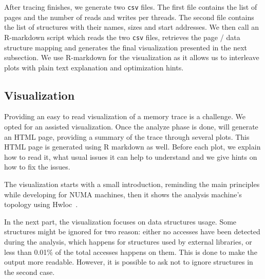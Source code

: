 After tracing finishes, we generate two \texttt{csv} files.
The first file contains the list of pages and the number of reads
and writes per threads. The second file contains the
list of structures with their names, sizes and start addresses.
We then call an R-markdown script which reads the two \texttt{csv} files,
retrieves the page / data structure mapping and generates the final
visualization presented in the next subsection.  We use R-markdown
for the visualization as it allows us to interleave plots with plain text
explanation and optimization hints.


\subsection{Visualization}
\label{sec:design-visu}

Providing an easy to read visualization of a memory trace is a challenge. We opted for an
assisted visualization. Once the analyze phase is done, \TABARNAC will
generate an HTML page, providing a summary of the trace through several plots.
This HTML page is generated using R markdown as well.
Before each plot, we explain how to read it, what
usual issues it can help to understand and we give hints on how to fix the issues.

The visualization starts with a small introduction, reminding the main
principles while developing for NUMA machines, then it shows the analysis
machine's topology using Hwloc~\cite{Broquedis10hwloc}.

In the next part, the visualization focuses on data structures usage. Some structures might
be ignored for two reason: either no accesses have been detected during the
analysis, which happens for structures used by external libraries, or less than 0.01\% of the total accesses happens on them. This is done to make the output
more readable. However, it is possible to ask \TABARNAC not to ignore
structures in the second case.

